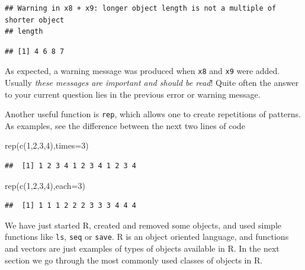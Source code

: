 \documentclass[
]{article}
\newenvironment{Shaded}{\begin{snugshade}}{\end{snugshade}}
\newcommand{\AttributeTok}[1]{\textcolor[rgb]{0.77,0.63,0.00}{#1}}
\newcommand{\DecValTok}[1]{\textcolor[rgb]{0.00,0.00,0.81}{#1}}
\newcommand{\FunctionTok}[1]{\textcolor[rgb]{0.00,0.00,0.00}{#1}}
\newcommand{\NormalTok}[1]{#1}
\begin{document}
\begin{verbatim}
## Warning in x8 + x9: longer object length is not a multiple of shorter object
## length
\end{verbatim}

\begin{verbatim}
## [1] 4 6 8 7
\end{verbatim}

As expected, a warning message was produced when \texttt{x8} and
\texttt{x9} were added. Usually \emph{these messages are important and
should be read}! Quite often the answer to your current question lies in
the previous error or warning message.

Another useful function is \texttt{rep}, which allows one to create
repetitions of patterns. As examples, see the difference between the
next two lines of code

\begin{Shaded}
\begin{Highlighting}[]
\FunctionTok{rep}\NormalTok{(}\FunctionTok{c}\NormalTok{(}\DecValTok{1}\NormalTok{,}\DecValTok{2}\NormalTok{,}\DecValTok{3}\NormalTok{,}\DecValTok{4}\NormalTok{),}\AttributeTok{times=}\DecValTok{3}\NormalTok{)}
\end{Highlighting}
\end{Shaded}

\begin{verbatim}
##  [1] 1 2 3 4 1 2 3 4 1 2 3 4
\end{verbatim}

\begin{Shaded}
\begin{Highlighting}[]
\FunctionTok{rep}\NormalTok{(}\FunctionTok{c}\NormalTok{(}\DecValTok{1}\NormalTok{,}\DecValTok{2}\NormalTok{,}\DecValTok{3}\NormalTok{,}\DecValTok{4}\NormalTok{),}\AttributeTok{each=}\DecValTok{3}\NormalTok{)}
\end{Highlighting}
\end{Shaded}

\begin{verbatim}
##  [1] 1 1 1 2 2 2 3 3 3 4 4 4
\end{verbatim}

We have just started R, created and removed some objects, and used
simple functions like \texttt{ls}, \texttt{seq} or \texttt{save}. R is
an object oriented language, and functions and vectors are just examples
of types of objects available in R. In the next section we go through
the most commonly used classes of objects in R.
\end{document}
